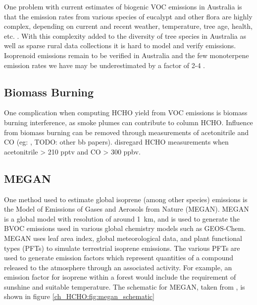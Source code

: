     One problem with current estimates of biogenic VOC emissions in Australia is that the emission rates from various species of eucalypt and other flora are highly complex, depending on current and recent weather, temperature, tree age, health, etc. \citep{Guenther2012}. 
    With this complexity added to the diversity of tree species in Australia as well as sparse rural data collections it is hard to model and verify emissions.
    Isoprenoid emissions remain to be verified in Australia and the few monoterpene emission rates we have may be underestimated by a factor of 2-4 \citep{Winters2009}.
  
  \subsection{Biomass Burning}
    One complication when computing HCHO yield from VOC emissions is biomass burning interference, as smoke plumes can contribute to column HCHO.
    Influence from biomass burning can be removed through measurements of acetonitrile and CO (eg: \citep{Wolfe2016}, TODO: other bb papers).
    \citet{Wolfe2016} disregard HCHO measurements when acetonitrile > 210 pptv and CO > 300 ppbv.
    
  \subsection{MEGAN}
    One method used to estimate global isoprene (among other species) emissions is the Model of Emissions of Gases and Aerosols from Nature (MEGAN). 
    MEGAN is a global model with resolution of around 1~km, and is used to generate the BVOC emissions used in various global chemistry models such as GEOS-Chem.
    MEGAN uses leaf area index, global meteorological data, and plant functional types (PFTs) to simulate terrestrial isoprene emissions.
    The various PFTs are used to generate emission factors which represent quantities of a compound released to the atmosphere through an associated activity.
    For example, an emission factor for isoprene within a forest would include the requirement of sunshine and suitable temperature.
    The schematic for MEGAN, taken from \citet{Megan_Website}, is shown in figure \ref{ch_HCHO:fig:megan_schematic}
    
